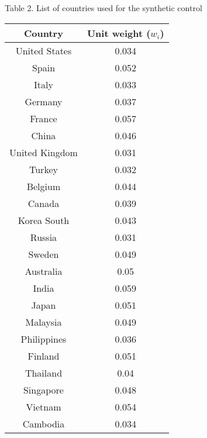\documentclass[12pt]{article}
\begin{document}
\clearpage

\begin{flushleft}
\centering Table 2. List of countries used for the synthetic control \end{flushleft}
\begin{table}[h!]
\centering
\begin{tabular}{ | p{7cm} | p{2cm} | }
\hline
\multicolumn{1}{|c|}{Country} & \multicolumn{1}{|c|}{Unit weight ($w_i$)}  \\ [0.5ex] 
\hline\hline
\multicolumn{1}{|c|}{United States} & \multicolumn{1}{|c|}{0.034} \\
\multicolumn{1}{|c|}{Spain} & \multicolumn{1}{|c|}{0.052} \\
\multicolumn{1}{|c|}{Italy} & \multicolumn{1}{|c|}{0.033} \\
\multicolumn{1}{|c|}{Germany} & \multicolumn{1}{|c|}{0.037} \\
\multicolumn{1}{|c|}{France} & \multicolumn{1}{|c|}{0.057} \\
\multicolumn{1}{|c|}{China} & \multicolumn{1}{|c|}{0.046} \\
\multicolumn{1}{|c|}{United Kingdom} & \multicolumn{1}{|c|}{0.031} \\
\multicolumn{1}{|c|}{Turkey} & \multicolumn{1}{|c|}{0.032} \\
\multicolumn{1}{|c|}{Belgium} & \multicolumn{1}{|c|}{0.044} \\
\multicolumn{1}{|c|}{Canada} & \multicolumn{1}{|c|}{0.039} \\
\multicolumn{1}{|c|}{Korea South} & \multicolumn{1}{|c|}{0.043} \\
\multicolumn{1}{|c|}{Russia} & \multicolumn{1}{|c|}{0.031} \\
\multicolumn{1}{|c|}{Sweden} & \multicolumn{1}{|c|}{0.049} \\
\multicolumn{1}{|c|}{Australia} & \multicolumn{1}{|c|}{0.05} \\
\multicolumn{1}{|c|}{India} & \multicolumn{1}{|c|}{0.059} \\
\multicolumn{1}{|c|}{Japan} & \multicolumn{1}{|c|}{0.051} \\
\multicolumn{1}{|c|}{Malaysia} & \multicolumn{1}{|c|}{0.049} \\
\multicolumn{1}{|c|}{Philippines} & \multicolumn{1}{|c|}{0.036} \\
\multicolumn{1}{|c|}{Finland} & \multicolumn{1}{|c|}{0.051} \\
\multicolumn{1}{|c|}{Thailand} & \multicolumn{1}{|c|}{0.04} \\
\multicolumn{1}{|c|}{Singapore} & \multicolumn{1}{|c|}{0.048} \\
\multicolumn{1}{|c|}{Vietnam} & \multicolumn{1}{|c|}{0.054} \\
\multicolumn{1}{|c|}{Cambodia} & \multicolumn{1}{|c|}{0.034} \\
\hline
\end{tabular}
\end{table}
\end{document}
